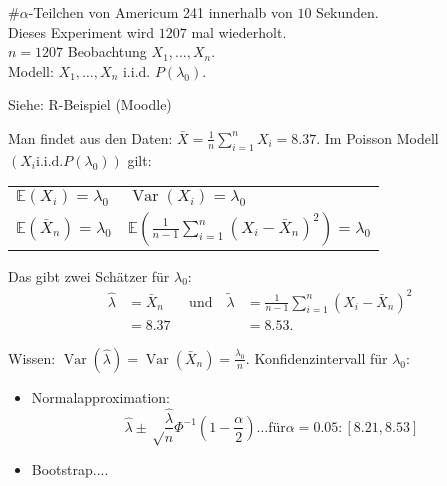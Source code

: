 \documentclass{tstextbook}
\DeclareMathOperator{\Var}{Var}
\newcommand{\E}{\mathbb E}
\begin{document}
\begin{example}
	$ \# \alpha $-Teilchen von Americum 241 innerhalb von $ 10 $ Sekunden. \\
	Dieses Experiment wird $ 1207 $ mal wiederholt.\\
	$ n=1207 $ Beobachtung $ X_1,\ldots,X_n. $\\
	Modell: $ X_1,\ldots,X_n $ i.i.d. $ P(\lambda_0). $
	
	Siehe: R-Beispiel (Moodle)
	
	Man findet aus den Daten: $ \bar{X} = \frac{1}{n} \sum_{i=1}^{n} X_i = 8.37 $.
	Im Poisson Modell $ (X_i \text{i.i.d.} P(\lambda_0)) $ gilt: 
	
	\begin{tabular}{ll}
		$ \E(X_i)=\lambda_0 $ 			& $ \Var(X_i) = \lambda_0 $ \\
		$ \E(\bar{X}_n) = \lambda_0 $ 	& $ \E\left(\frac{1}{n-1} \sum_{i=1}^{n}(X_i - \bar{X}_n)^2\right) = \lambda_0 $
	\end{tabular}
	
	Das gibt zwei Schätzer für $ \lambda_0 $:
	\[
	\begin{aligned}
		\hat{\lambda} & = \bar{X}_n \quad & \text{und} \quad \tilde{\lambda} & = \frac{1}{n-1} \sum_{i=1}^{n}(X_i - \bar{X}_n)^2 \\
		& = 8.37 & 						& = 8.53.
	\end{aligned}
	\]
	
	Wissen: $ \Var(\hat{\lambda}) = \Var(\bar{X}_n) = \frac{\lambda_0}{n} $.
	Konfidenzintervall für $ \lambda_0 $: 
	\begin{itemize}
		\item Normalapproximation:
		\[ \hat{\lambda} \pm \sqrt\frac{\hat{\lambda}}{n} \Phi^{-1} \left(1-\frac{\alpha}{2}\right) \ldots \text{für} \alpha = 0.05: [8.21,8.53] \]
		\item Bootstrap....
	\end{itemize}
\end{example}


\printbibliography{}


\printindex
\end{document}

